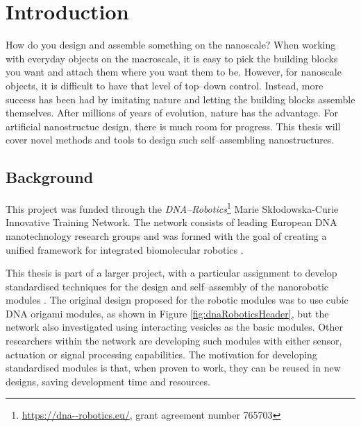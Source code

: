 
\chapter{Introduction}\label{ch:1-intro}

\minitoc

How do you design and assemble something on the nanoscale? When working with everyday objects on the macroscale, it is easy to pick the building blocks you want and attach them where you want them to be. However, for nanoscale objects, it is difficult to have that level of top--down control. Instead, more success has been had by imitating nature and letting the building blocks assemble themselves. After millions of years of evolution, nature has the advantage. For artificial nanostructue design, there is much room for progress. This thesis will cover novel methods and tools to design such self--assembling nanostructures.

\section{Background}
This project was funded through the \emph{DNA--Robotics}\footnote{\url{https://dna--robotics.eu/}, grant agreement number 765703} Marie Skłodowska-Curie Innovative Training Network. The network consists of leading European DNA nanotechnology research groups and was formed with the goal of creating a unified framework for integrated biomolecular robotics \cite{dnaroboticsResearch}.

This thesis is part of a larger project, with a particular assignment to develop standardised techniques for the design and self--assembly of the nanorobotic modules \cite{dnaroboticsESR12}. The original design proposed for the robotic modules was to use cubic DNA origami modules, as shown in Figure \ref{fig:dnaRoboticsHeader}, but the network also investigated using interacting vesicles as the basic modules. Other researchers within the network are developing such modules with either sensor, actuation or signal processing capabilities. The motivation for developing standardised modules is that, when proven to work, they can be reused in new designs, saving development time and resources.

